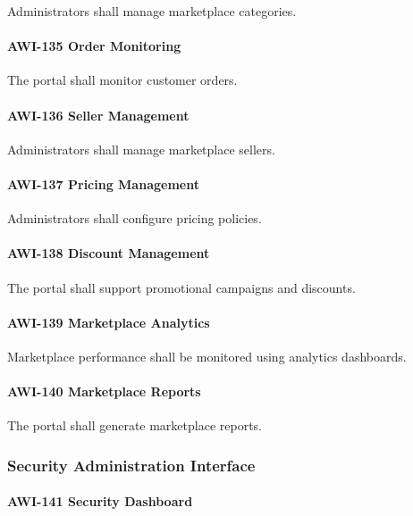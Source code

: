 Administrators shall manage marketplace categories.

\paragraph{AWI-135 Order Monitoring}

The portal shall monitor customer orders.

\paragraph{AWI-136 Seller Management}

Administrators shall manage marketplace sellers.

\paragraph{AWI-137 Pricing Management}

Administrators shall configure pricing policies.

\paragraph{AWI-138 Discount Management}

The portal shall support promotional campaigns and discounts.

\paragraph{AWI-139 Marketplace Analytics}

Marketplace performance shall be monitored using analytics dashboards.

\paragraph{AWI-140 Marketplace Reports}

The portal shall generate marketplace reports.


\subsubsection*{Security Administration Interface}

\paragraph{AWI-141 Security Dashboard}

